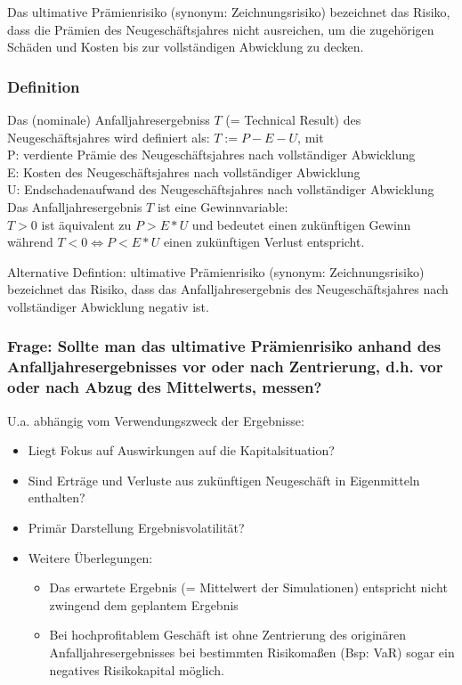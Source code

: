 \documentclass[12pt]{report}
\theoremstyle{dotless}
\theoremstyle{definition}
\begin{document}
Das ultimative Prämienrisiko (synonym: Zeichnungsrisiko) bezeichnet das Risiko,
dass die Prämien des Neugeschäftsjahres nicht ausreichen, um die zugehörigen Schäden
und Kosten bis zur vollständigen Abwicklung zu decken.

\subsubsection{Definition}
Das (nominale) Anfalljahresergebniss $T$ (= Technical Result) des Neugeschäftsjahres wird definiert als: $T:= P - E - U$, mit \\
P: verdiente Prämie des Neugeschäftsjahres nach vollständiger Abwicklung\\
E: Kosten des Neugeschäftsjahres nach vollständiger Abwicklung \\
U: Endschadenaufwand des Neugeschäftsjahres nach vollständiger Abwicklung \\

Das Anfalljahresergebnis $T$ ist eine Gewinnvariable: \\
$T>0$ ist äquivalent zu $P>E*U$ und bedeutet einen zukünftigen Gewinn \\
während $T<0 \Leftrightarrow P<E*U$ einen zukünftigen Verlust entspricht.

Alternative Defintion: ultimative Prämienrisiko (synonym: Zeichnungsrisiko) bezeichnet das Risiko, dass das Anfalljahresergebnis des Neugeschäftsjahres nach vollständiger Abwicklung negativ ist.

\subsubsection{Frage: Sollte man das ultimative Prämienrisiko anhand des Anfalljahresergebnisses vor oder nach Zentrierung, d.h. vor oder nach Abzug des Mittelwerts, messen?}
U.a. abhängig vom Verwendungszweck der Ergebnisse:
\begin{itemize}
\item Liegt Fokus auf Auswirkungen auf die Kapitalsituation?
\item Sind Erträge und Verluste aus zukünftigen Neugeschäft in Eigenmitteln enthalten?
\item Primär Darstellung Ergebnisvolatilität?
\item Weitere Überlegungen:
\begin{itemize}
\item Das erwartete Ergebnis (= Mittelwert der Simulationen) entspricht nicht zwingend dem geplantem Ergebnis
\item Bei hochprofitablem Geschäft ist ohne Zentrierung des originären Anfalljahresergebnisses bei bestimmten Risikomaßen (Bsp: VaR) sogar ein negatives Risikokapital möglich.
\end{itemize}
\end{itemize}
\end{document}
